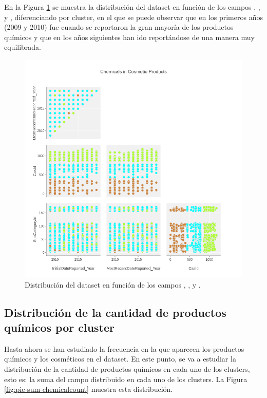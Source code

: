 En la Figura \ref{fig:splom-data-aggregated} se muestra la distribución del dataset en función de los campos , ,  y , diferenciando por cluster, en el que se puede observar que en los primeros años (2009 y 2010) fue cuando se reportaron la gran mayoría de los productos químicos y que en los años siguientes han ido reportándose de una manera muy equilibrada.

\begin{figure}[!th]
\includegraphics[scale=0.5]{figures/splom-data-aggregated}
\centering
\caption{Distribución del dataset en función de los campos , ,  y .}
\label{fig:splom-data-aggregated}
\end{figure}




\newpage
\subsection{Distribución de la cantidad de productos químicos por cluster}
\label{sec:chemicals-per-cluster}

Hasta ahora se han estudiado la frecuencia en la que aparecen los productos químicos y los cosméticos en el dataset. En este punto, se va a estudiar la distribución de la cantidad de productos químicos en cada uno de los clusters, esto es: la suma del campo  distribuido en cada uno de los clusters. La Figura \ref{fig:pie-sum-chemicalcount} muestra esta distribución.


